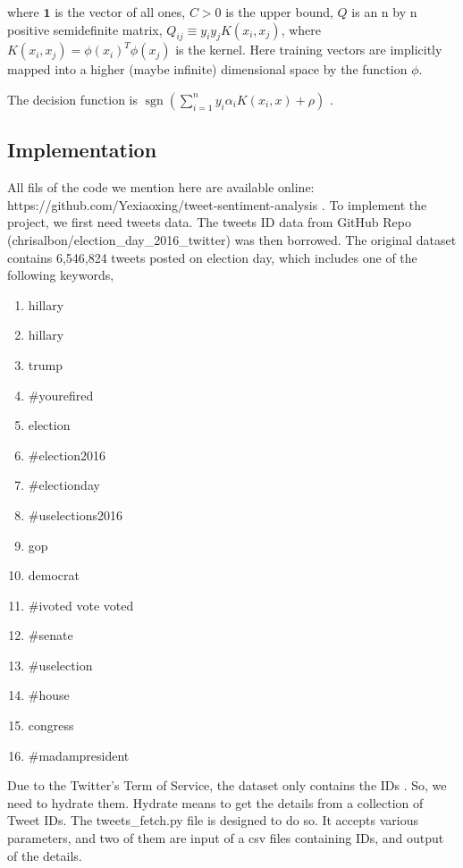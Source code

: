 \documentclass[12pt,a4paper]{article}
\begin{document}
      where $\mathbf{1}$ is the vector of all ones, $C > 0$ is the upper bound, $Q$ is an n by n positive semidefinite matrix, $Q_{ij} \equiv y_i y_j K(x_i, x_j)$, where $K(x_i, x_j) = \phi (x_i)^T \phi (x_j)$ is the kernel. Here training vectors are implicitly mapped into a higher (maybe infinite) dimensional space by the function $\phi$.

      The decision function is $\operatorname{sgn}(\sum_{i=1}^n y_i \alpha_i K(x_i, x) + \rho)$ \cite{scikit-learn}.

  \subsection{Implementation}
    All fils of the code we mention here are available online: https://github.com/Yexiaoxing/tweet-sentiment-analysis .
    To implement the project, we first need tweets data. The tweets ID data from GitHub Repo (chrisalbon/election_day_2016_twitter) was then borrowed. The original dataset contains 6,546,824 tweets posted on election day, which includes one of the following keywords,

    \begin{enumerate}
      \item hillary
      \item hillary
      \item trump
      \item \#yourefired
      \item election
      \item \#election2016
      \item \#electionday
      \item \#uselections2016
      \item gop
      \item democrat
      \item \#ivoted vote voted
      \item \#senate
      \item \#uselection
      \item \#house
      \item congress
      \item \#madampresident
    \end{enumerate}

    Due to the Twitter's Term of Service, the dataset only contains the IDs \cite{twitter_2018}. So, we need to hydrate them. Hydrate means to get the details from a collection of Tweet IDs. The tweets_fetch.py file is designed to do so. It accepts various parameters, and two of them are input of a csv files containing IDs, and output of the details.
\end{document}
